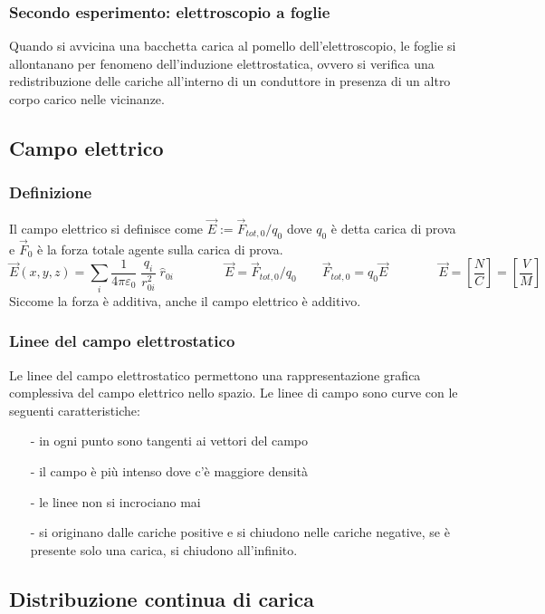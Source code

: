 \documentclass[a4paper]{article}
\begin{document}
\subsubsection*{Secondo esperimento: elettroscopio a foglie}
Quando si avvicina una bacchetta carica al pomello dell'elettroscopio, le foglie si allontanano per fenomeno dell'induzione
elettrostatica, ovvero si verifica una redistribuzione delle cariche all'interno di un conduttore in presenza di un altro corpo
carico nelle vicinanze.

\subsection{Campo elettrico}
\subsubsection*{Definizione}
Il campo elettrico si definisce come \(\vec{E} := \vec{F}_{tot,0}/q_0\) dove \(q_0\) è detta carica di prova e \(\vec{F}_0\) è
la forza totale agente sulla carica di prova.
\[\vec{E}(x,y,z) = \sum_{i} \frac{1}{4 \pi \varepsilon_0} \; \frac{q_i}{r_{0i}^2} \; \hat{r}_{0i} \qquad \qquad \vec{E} = \vec{F}_{tot,0}/q_0 \qquad \vec{F}_{tot,0} = q_0 \vec{E} \qquad \qquad \vec{E} = \left[ \frac{N}{C} \right] = \left[ \frac{V}{M} \right]\]
Siccome la forza è additiva, anche il campo elettrico è additivo.

\subsubsection*{Linee del campo elettrostatico}
Le linee del campo elettrostatico permettono una rappresentazione grafica complessiva del campo elettrico nello spazio. Le linee
di campo sono curve con le seguenti caratteristiche:
\begin{itemize}[topsep=3pt, itemsep=0pt]
	\item[-] in ogni punto sono tangenti ai vettori del campo
	\item[-] il campo è più intenso dove c'è maggiore densità
	\item[-] le linee non si incrociano mai
	\item[-] si originano dalle cariche positive e si chiudono nelle cariche negative, se è presente solo una carica, si chiudono
	all'infinito.
\end{itemize}

\subsection{Distribuzione continua di carica}
\end{document}
